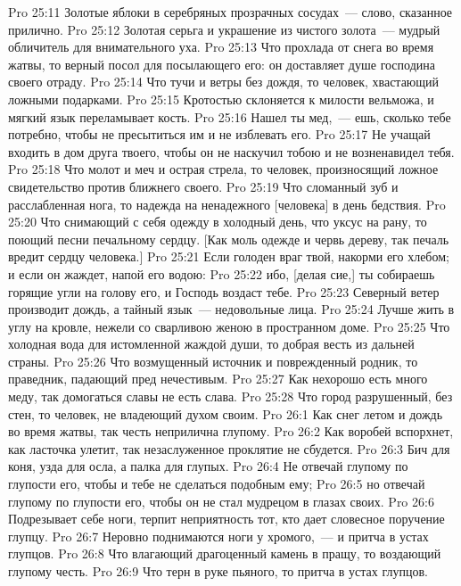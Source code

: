 \vs Pro 25:11 Золотые яблоки в серебряных прозрачных сосудах~--- слово, сказанное прилично.
\vs Pro 25:12 Золотая серьга и украшение из чистого золота~--- мудрый обличитель для внимательного уха.
\vs Pro 25:13 Что прохлада от снега во время жатвы, то верный посол для посылающего его: он доставляет душе господина своего отраду.
\vs Pro 25:14 Что тучи и ветры без дождя, то человек, хвастающий ложными подарками.
\vs Pro 25:15 Кротостью склоняется к милости вельможа, и мягкий язык переламывает кость.
\vs Pro 25:16 Нашел ты мед,~--- ешь, сколько тебе потребно, чтобы не пресытиться им и не изблевать его.
\vs Pro 25:17 Не учащай входить в дом друга твоего, чтобы он не наскучил тобою и не возненавидел тебя.
\vs Pro 25:18 Что молот и меч и острая стрела, то человек, произносящий ложное свидетельство против ближнего своего.
\vs Pro 25:19 Что сломанный зуб и расслабленная нога, то надежда на ненадежного [человека] в день бедствия.
\vs Pro 25:20 Что снимающий с себя одежду в холодный день, что уксус на рану, то поющий песни печальному сердцу. [Как моль одежде и червь дереву, так печаль вредит сердцу человека.]
\vs Pro 25:21 Если голоден враг твой, накорми его хлебом; и если он жаждет, напой его водою:
\vs Pro 25:22 ибо, [делая сие,] ты собираешь горящие угли на голову его, и Господь воздаст тебе.
\vs Pro 25:23 Северный ветер производит дождь, а тайный язык~--- недовольные лица.
\vs Pro 25:24 Лучше жить в углу на кровле, нежели со сварливою женою в пространном доме.
\vs Pro 25:25 Что холодная вода для истомленной жаждой души, то добрая весть из дальней страны.
\vs Pro 25:26 Что возмущенный источник и поврежденный родник, то праведник, падающий пред нечестивым.
\vs Pro 25:27 Как нехорошо есть много меду, так домогаться славы не есть слава.
\vs Pro 25:28 Что город разрушенный, без стен, то человек, не владеющий духом своим.
\vs Pro 26:1 Как снег летом и дождь во время жатвы, так честь неприлична глупому.
\vs Pro 26:2 Как воробей вспорхнет, как ласточка улетит, так незаслуженное проклятие не сбудется.
\vs Pro 26:3 Бич для коня, узда для осла, а палка для глупых.
\vs Pro 26:4 Не отвечай глупому по глупости его, чтобы и тебе не сделаться подобным ему;
\vs Pro 26:5 но отвечай глупому по глупости его, чтобы он не стал мудрецом в глазах своих.
\vs Pro 26:6 Подрезывает себе ноги, терпит неприятность тот, кто дает словесное поручение глупцу.
\vs Pro 26:7 Неровно поднимаются ноги у хромого,~--- и притча в устах глупцов.
\vs Pro 26:8 Что влагающий драгоценный камень в пращу, то воздающий глупому честь.
\vs Pro 26:9 Что  терн в руке пьяного, то притча в устах глупцов.
